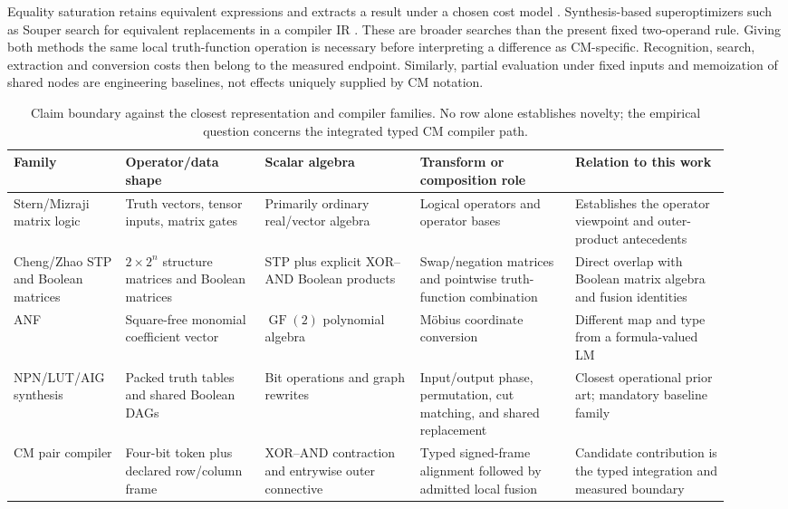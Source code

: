 \documentclass[11pt]{article}
\newcommand{\GFtwo}{\operatorname{GF}(2)}
\begin{document}
{Equality saturation retains equivalent expressions and extracts a result
under a chosen cost model \citep{willsey2021}. Synthesis-based superoptimizers
such as Souper search for equivalent replacements in a compiler IR
\citep{sasnauskas2017}. These are broader searches than the present fixed
two-operand rule. Giving both methods the same local truth-function operation
is necessary before interpreting a difference as CM-specific. Recognition,
search, extraction and conversion costs then belong to the measured endpoint.
Similarly, partial evaluation under fixed inputs and memoization of shared
nodes are engineering baselines, not effects uniquely supplied by CM notation.


\begin{table}[H]
  \centering
  \scriptsize
  \setlength{\tabcolsep}{3pt}
  \begin{tabular}{@{}L{0.14\linewidth}L{0.18\linewidth}L{0.20\linewidth}L{0.20\linewidth}L{0.20\linewidth}@{}}
    \toprule
    Family & Operator/data shape & Scalar algebra & Transform or composition role & Relation to this work \\
    \midrule
    Stern/Mizraji matrix logic & Truth vectors, tensor inputs, matrix gates & Primarily ordinary real/vector algebra & Logical operators and operator bases & Establishes the operator viewpoint and outer-product antecedents \\
    Cheng/Zhao STP and Boolean matrices & $2\times2^n$ structure matrices and Boolean matrices & STP plus explicit XOR--AND Boolean products & Swap/negation matrices and pointwise truth-function combination & Direct overlap with Boolean matrix algebra and fusion identities \\
    ANF & Square-free monomial coefficient vector & $\GFtwo$ polynomial algebra & M\"obius coordinate conversion & Different map and type from a formula-valued LM \\
    NPN/LUT/AIG synthesis & Packed truth tables and shared Boolean DAGs & Bit operations and graph rewrites & Input/output phase, permutation, cut matching, and shared replacement & Closest operational prior art; mandatory baseline family \\
    CM pair compiler & Four-bit token plus declared row/column frame & XOR--AND contraction and entrywise outer connective & Typed signed-frame alignment followed by admitted local fusion & Candidate contribution is the typed integration and measured boundary \\
    \bottomrule
  \end{tabular}
  \caption{Claim boundary against the closest representation and compiler
  families. No row alone establishes novelty; the empirical question concerns
  the integrated typed CM compiler path.}
  \label{tab:related-work-boundary}
\end{table}

}
\end{document}
